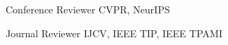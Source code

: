 

\begin{cvskills}

  \cvskill
    {Conference Reviewer} %
    {CVPR, NeurIPS} %
   
  \cvskill
    {Journal Reviewer} %
    {IJCV, IEEE TIP, IEEE TPAMI} %

\end{cvskills}
